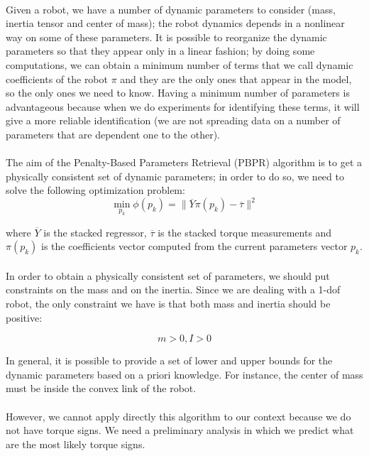 \documentclass{article}
\begin{document}
\paragraph{}Given a robot, we have a number of dynamic parameters to consider (mass, inertia tensor and center of mass); the robot dynamics depends in a nonlinear way on some of these parameters. It is possible to reorganize the dynamic parameters so that they appear only in a linear fashion; by doing some computations, we can obtain a minimum number of terms that we call dynamic coefficients of the robot $\pi$ and they are the only ones that appear in the model, so the only ones we need to know. Having a minimum number of parameters is advantageous because when we do experiments for identifying these terms, it  will give a more reliable identification (we are not spreading data on a number of parameters that are dependent one to the other).

\paragraph{}The aim of the Penalty-Based Parameters Retrieval (PBPR) algorithm is to get a physically consistent set of dynamic parameters; in order to do so, we need to solve the following optimization problem:
\[\min_{p_k}{\phi(p_k)} = \lVert \overline{Y}\pi(p_k)-\overline{\tau} \rVert^2\]

\noindent where $\overline{Y}$ is the stacked regressor, $\overline{\tau}$ is the stacked  torque measurements and $\pi(p_k)$ is the coefficients vector computed from the current parameters vector $p_k$.

\paragraph{}In order to obtain a physically consistent set of parameters, we should put constraints on the mass and on the inertia. Since we are dealing with a 1-dof robot, the only constraint we have is that both mass and inertia should be positive:

\[m > 0, I > 0\]

In general, it is possible to provide a set of lower and upper bounds for the dynamic parameters based on a priori knowledge. For instance, the center of mass must be inside the convex link of the robot. 

\paragraph{}However, we cannot apply directly this algorithm to our context because we do not have torque signs.  We need a preliminary analysis in which we predict what are the most likely torque signs.
\end{document}
